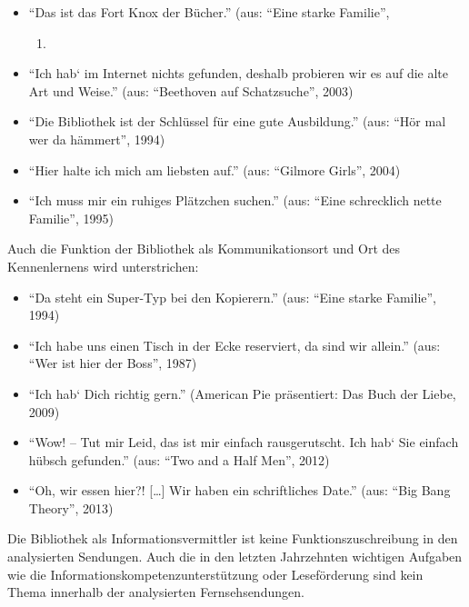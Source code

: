 \begin{itemize}
\item
  \enquote{Das ist das Fort Knox der Bücher.} (aus: \enquote{Eine starke
  Familie},

  \begin{enumerate}
  \def\labelenumi{\arabic{enumi})}
  \setcounter{enumi}{1993}
  \item
  \end{enumerate}
\item
  \enquote{Ich hab` im Internet nichts gefunden, deshalb probieren wir
  es auf die alte Art und Weise.} (aus: \enquote{Beethoven auf
  Schatzsuche}, 2003)
\item
  \enquote{Die Bibliothek ist der Schlüssel für eine gute Ausbildung.}
  (aus: \enquote{Hör mal wer da hämmert}, 1994)
\item
  \enquote{Hier halte ich mich am liebsten auf.} (aus: \enquote{Gilmore
  Girls}, 2004)
\item
  \enquote{Ich muss mir ein ruhiges Plätzchen suchen.} (aus:
  \enquote{Eine schrecklich nette Familie}, 1995)
\end{itemize}

Auch die Funktion der Bibliothek als Kommunikationsort und Ort des
Kennenlernens wird unterstrichen:

\begin{itemize}
\item
  \enquote{Da steht ein Super-Typ bei den Kopierern.} (aus:
  \enquote{Eine starke Familie}, 1994)
\item
  \enquote{Ich habe uns einen Tisch in der Ecke reserviert, da sind wir
  allein.} (aus: \enquote{Wer ist hier der Boss}, 1987)
\item
  \enquote{Ich hab` Dich richtig gern.} (American Pie präsentiert: Das
  Buch der Liebe, 2009)
\item
  \enquote{Wow! -- Tut mir Leid, das ist mir einfach rausgerutscht. Ich
  hab` Sie einfach hübsch gefunden.} (aus: \enquote{Two and a Half Men},
  2012)
\item
  \enquote{Oh, wir essen hier?! {[}\ldots{}{]} Wir haben ein
  schriftliches Date.} (aus: \enquote{Big Bang Theory}, 2013)
\end{itemize}

Die Bibliothek als Informationsvermittler ist keine
Funktionszuschreibung in den analysierten Sendungen. Auch die in den
letzten Jahrzehnten wichtigen Aufgaben wie die
Informationskompetenzunterstützung oder Leseförderung sind kein Thema
innerhalb der analysierten Fernsehsendungen.

